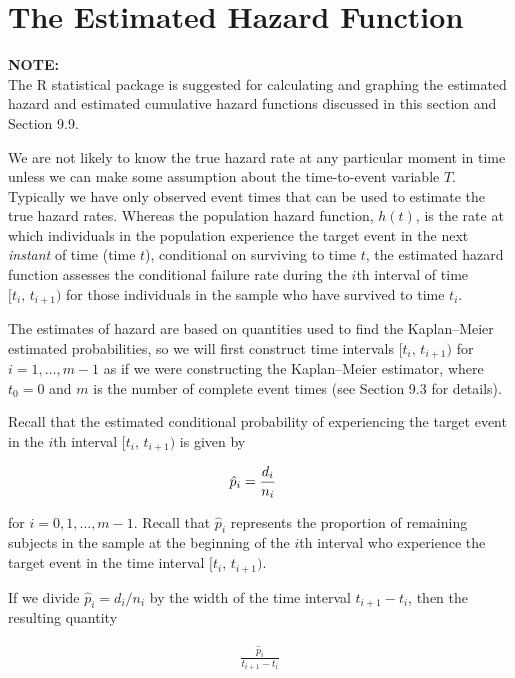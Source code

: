 \documentclass[
]{report}
\begin{document}
\section*{The Estimated Hazard Function}\label{the-estimated-hazard-function}

\large

\textbf{NOTE:}\\
The R statistical package is suggested for calculating and graphing the estimated hazard and estimated cumulative hazard functions discussed in this section and Section 9.9.\\
\normalsize

We are not likely to know the true hazard rate at any particular moment in time unless we can make some assumption about the time-to-event variable \(T\). Typically we have only observed event times that can be used to estimate the true hazard rates. Whereas the population hazard function, \(h(t)\), is the rate at which individuals in the population experience the target event in the next \emph{instant} of time (time \(t\)), conditional on surviving to time \(t\), the estimated hazard function assesses the conditional failure rate during the \(i\)th interval of time \([t_i,\,t_{i+1})\) for those individuals in the sample who have survived to time \(t_i\).

The estimates of hazard are based on quantities used to find the Kaplan--Meier estimated probabilities, so we will first construct time intervals \([t_i,\,t_{i+1})\) for \(i = 1,\dots,m-1\) as if we were constructing the Kaplan--Meier estimator, where \(t_0 = 0\) and \(m\) is the number of complete event times (see Section 9.3 for details).

Recall that the estimated conditional probability of experiencing the target event in the \(i\)th interval \([t_i,\,t_{i+1})\) is given by

\begin{align}
\hat p_i &= \frac{d_i}{n_i}
\notag
\end{align}

for \(i=0,1,\dots,m-1\). Recall that \(\hat p_i\) represents the proportion of remaining subjects in the sample at the beginning of the \(i\)th interval who experience the target event in the time interval \([t_i,\,t_{i+1})\).

If we divide \(\hat p_i = d_i/n_i\) by the width of the time interval \(t_{i+1}-t_i\), then the resulting quantity

\begin{align}\label{9.15}
\frac{\hat p_i}{t_{i+1} - t_i}
\tag{9.15}
\end{align}
\end{document}
